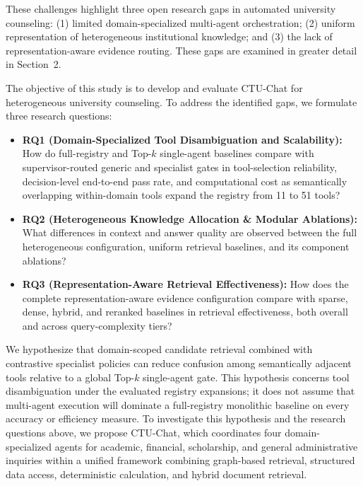 These challenges highlight three open research gaps in automated university counseling: (1) limited domain-specialized multi-agent orchestration; (2) uniform representation of heterogeneous institutional knowledge; and (3) the lack of representation-aware evidence routing. These gaps are examined in greater detail in Section~2.

The objective of this study is to develop and evaluate CTU-Chat for heterogeneous university counseling. To address the identified gaps, we formulate three research questions:
\begin{itemize}
    \setlength{\itemsep}{1.5pt}
    \setlength{\parsep}{0pt}
    \setlength{\parskip}{0pt}

    \item \textbf{RQ1 (Domain-Specialized Tool Disambiguation and Scalability):}
    How do full-registry and Top-$k$ single-agent baselines compare with supervisor-routed generic and specialist gates in tool-selection reliability, decision-level end-to-end pass rate, and computational cost as semantically overlapping within-domain tools expand the registry from 11 to 51 tools?

    \item \textbf{RQ2 (Heterogeneous Knowledge Allocation \& Modular Ablations):}
    What differences in context and answer quality are observed between the full heterogeneous configuration, uniform retrieval baselines, and its component ablations?

    \item \textbf{RQ3 (Representation-Aware Retrieval Effectiveness):}
    How does the complete representation-aware evidence configuration compare with sparse, dense, hybrid, and reranked baselines in retrieval effectiveness, both overall and across query-complexity tiers?
\end{itemize}

We hypothesize that domain-scoped candidate retrieval combined with contrastive specialist policies can reduce confusion among semantically adjacent tools relative to a global Top-$k$ single-agent gate. This hypothesis concerns tool disambiguation under the evaluated registry expansions; it does not assume that multi-agent execution will dominate a full-registry monolithic baseline on every accuracy or efficiency measure. To investigate this hypothesis and the research questions above, we propose CTU-Chat, which coordinates four domain-specialized agents for academic, financial, scholarship, and general administrative inquiries within a unified framework combining graph-based retrieval, structured data access, deterministic calculation, and hybrid document retrieval.

